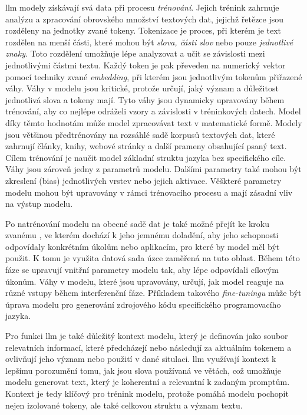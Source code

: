 \documentclass[czech, ma, kiv, he, iso690numb, pdf, viewonly]{fasthesis}
\begin{document}
    \Gls{llm} modely získávají svá data při procesu \textit{trénování}. Jejich trénink zahrnuje analýzu a zpracování obrovského množství textových dat, jejichž řetězce jsou rozděleny na jednotky zvané \gls{token}y. Tokenizace je proces, při kterém je text rozdělen na menší části, které mohou být \textit{slova, části slov} nebo pouze \textit{jednotlivé znaky}. Toto rozdělení umožňuje lépe analyzovat a učit se závislosti mezi jednotlivými částmi textu. Každý token je pak převeden na numerický vektor pomocí techniky zvané \emph{embedding}, při kterém jsou jednotlivým tokenům přiřazené váhy. Váhy v modelu jsou kritické, protože určují, jaký význam a důležitost jednotlivá slova a tokeny mají. Tyto váhy jsou dynamicky upravovány během trénování, aby co nejlépe odráželi vzory a závislosti v tréninkových datech. Model díky těmto hodnotám může model zpracovávat text v matematické formě. Modely jsou většinou předtrénovány na rozsáhlé sadě korpusů textových dat, které zahrnují články, knihy, webové stránky a další prameny obsahující psaný text. Cílem trénování je naučit model základní struktu jazyka bez specifického cíle. Váhy jsou zároveň jedny z parametrů modelu. Dalšími parametry také mohou být zkreslení (bias) jednotlivých vrstev nebo jejich aktivace. Věškteré parametry modelu mohou být upravovány v rámci trénovacího procesu a mají zásadní vliv na výstup modelu. \cite{prazak2022embedding} \cite{prazak2022seq2seq}

    Po natrénování modelu na obecné sadě dat je také možné přejít ke kroku zvanému , ve kterém dochází k jeho jemnému doladění, aby jeho schopnosti odpovídaly konkrétním úkolům nebo aplikacím, pro které by model měl být použit. K tomu je využita datová sada úzce zaměřená na tuto oblast. Během této fáze se upravují vnitřní parametry modelu tak, aby lépe odpovídali cílovým úkonům. Váhy v modelu, které jsou upravovány, určují, jak model reaguje na různé vstupy během interferenční fáze. Příkladem takového \textit{fine-tuningu} může být úprava modelu pro generování zdrojového kódu specifického programovacího jazyka.

    \pagebreak
    Pro funkci \Gls{llm} je také důležitý kontext modelu, který je definován jako soubor relevatních informací, které předcházejí nebo následují za aktuálním tokenem a ovlivňují jeho význam nebo použití v dané situlaci. \Gls{llm} využívají kontext k lepšímu porozumění tomu, jak jsou slova používaná ve větách, což umožňuje modelu generovat text, který je koherentní a relevantní k zadaným promptům. Kontext je tedy klíčový pro trénink modelu, protože pomáhá modelu pochopit nejen izolované tokeny, ale také celkovou struktu a význam textu.
\end{document}
